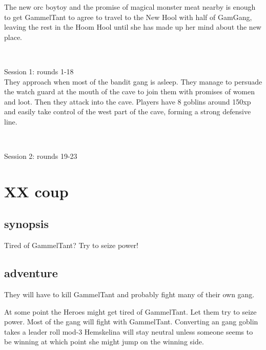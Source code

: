 The new orc boytoy and the promise of magical monster meat nearby is enough to get GammelTant to agree to travel to the New Hool with half of GamGang, leaving the rest in the Hoom Hool until she has made up her mind about the new place.

\

Session 1: rounds 1-18 \\
They approach when most of the bandit gang is asleep. They manage to persuade the watch guard at the mouth of the cave to join them with promises of women and loot. Then they attack into the cave. Players have 8 goblins around 150xp and easily take control of the west part of the cave, forming a strong defensive line.

\

Session 2: rounds 19-23 \\



















\newpage
\section*{XX coup}


\subsection*{synopsis}

Tired of GammelTant? Try to seize power!


\subsection*{adventure}

They will have to kill GammelTant and probably fight many of their own gang. 

At some point the Heroes might get tired of GammelTant. Let them try to seize power. Most of the gang will fight with GammelTant. Converting an gang goblin takes a leader roll mod-3 
Hemskelina will stay neutral unless someone seems to be winning at which point she might jump on the winning side.


